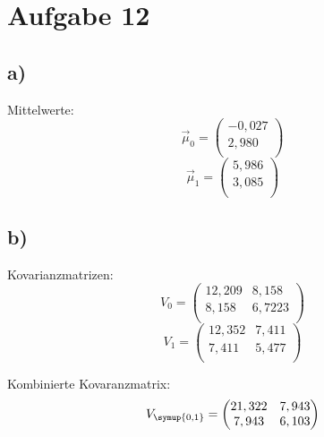 \section{Aufgabe 12}
\subsection{a)}
Mittelwerte:
\begin{equation*}
  \vec{\mu}_0 = \begin{pmatrix}
                  -0,027\\
                   2,980\\
  \end{pmatrix}
\end{equation*}
\begin{equation*}
  \vec{\mu}_1 = \begin{pmatrix}
                   5,986\\
                   3,085\\
  \end{pmatrix}
\end{equation*}

\subsection{b)}
Kovarianzmatrizen:
\begin{equation*}
  V_0 = \begin{pmatrix}
                  12,209 &  8,158 \\
                  8,158  &  6,7223 \\
  \end{pmatrix}
\end{equation*}
\begin{equation*}
  V_1 = \begin{pmatrix}
                  12,352 &  7,411 \\
                  7,411 &  5,477 \\
  \end{pmatrix}
\end{equation*}

Kombinierte Kovaranzmatrix:
\begin{equation*}
  V_{\symup{0,1}} = \begin{pmatrix}
                  21,322 &  7,943 \\
                  7,943 &  6,103 \\
  \end{pmatrix}
\end{equation*}

